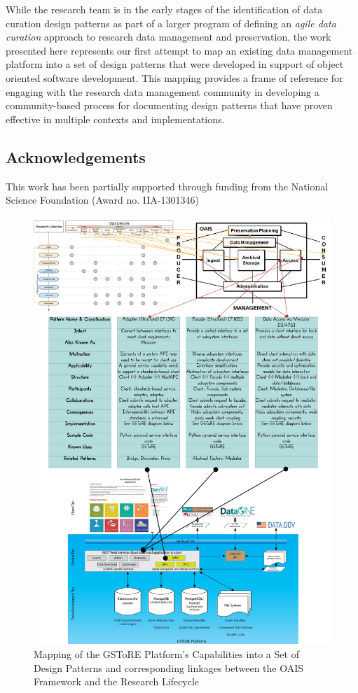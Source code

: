 \documentclass[final]{beamer}
\begin{document}
\begin{frame}[t]
\begin{multicols}{3}
While the research team is in the early stages of the identification of
data curation design patterns as part of a larger program of defining an
\emph{agile data curation} approach to research data management and
preservation, the work presented here represents our first attempt to
map an existing data management platform into a set of design patterns
that were developed in support of object oriented software development.
This mapping provides a frame of reference for engaging with the
research data management community in developing a community-based
process for documenting design patterns that have proven effective in
multiple contexts and implementations.

\subsection{Acknowledgements}\label{acknowledgements}

This work has been partially supported through funding from the National
Science Foundation (Award no. IIA-1301346)

\vfill\columnbreak

\begin{figure}[htbp]
\centering
\includegraphics[width=11.00000in]{Composite-DesignPatternMapping.png}
\caption{Mapping of the GSToRE Platform's Capabilities into a Set of
Design Patterns and corresponding linkages between the OAIS Framework
and the Research Lifecycle}
\end{figure}


\end{multicols}
\end{frame}
\end{document}
